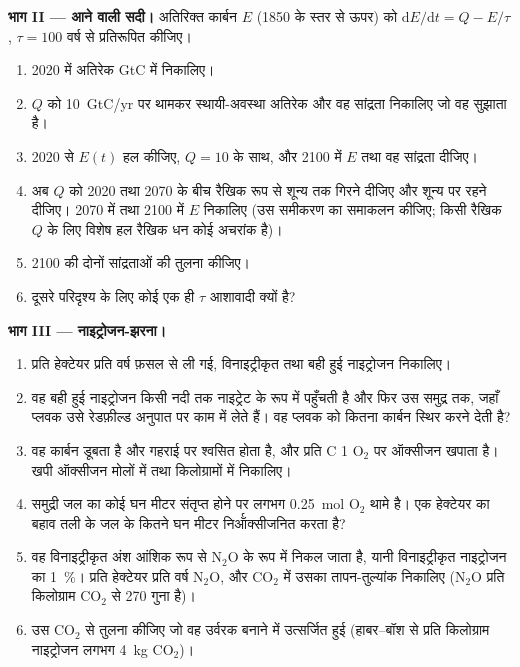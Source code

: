 \begin{problem}
\medskip
\noindent\textbf{भाग II --- आने वाली सदी।}
अतिरिक्त कार्बन $E$ (1850 के स्तर से ऊपर) को
$\mathrm{d}E/\mathrm{d}t = Q - E/\tau$, $\tau = 100$ वर्ष से प्रतिरूपित कीजिए।
\begin{enumerate}[resume]
  \item 2020 में अतिरेक GtC में निकालिए।
  \item $Q$ को \qty{10}{GtC/yr} पर थामकर स्थायी-अवस्था
        अतिरेक और वह सांद्रता निकालिए जो वह सुझाता है।
  \item 2020 से $E(t)$ हल कीजिए, $Q = 10$ के साथ, और 2100 में $E$
        तथा वह सांद्रता दीजिए।
  \item अब $Q$ को 2020 तथा 2070 के बीच रैखिक रूप से शून्य तक गिरने दीजिए और
        शून्य पर रहने दीजिए। 2070 में तथा 2100 में $E$ निकालिए (उस समीकरण का
        समाकलन कीजिए; किसी रैखिक $Q$ के लिए विशेष हल रैखिक धन कोई
        अचरांक है)।
  \item 2100 की दोनों सांद्रताओं की तुलना कीजिए।
  \item दूसरे परिदृश्य के लिए कोई एक ही $\tau$ आशावादी क्यों है?
\end{enumerate}

\medskip
\noindent\textbf{भाग III --- नाइट्रोजन-झरना।}
\begin{enumerate}[resume]
  \item प्रति हेक्टेयर प्रति वर्ष फ़सल से ली गई, विनाइट्रीकृत तथा
        बही हुई नाइट्रोजन निकालिए।
  \item वह बही हुई नाइट्रोजन किसी नदी तक नाइट्रेट के रूप में पहुँचती है और फिर उस
        समुद्र तक, जहाँ प्लवक उसे रेडफ़ील्ड अनुपात पर काम में लेते हैं। वह प्लवक को कितना
        कार्बन स्थिर करने देती है?
  \item वह कार्बन डूबता है और गहराई पर श्वसित होता है, और
        प्रति C 1 $\mathrm{O_2}$ पर ऑक्सीजन खपाता है। खपी ऑक्सीजन
        मोलों में तथा किलोग्रामों में निकालिए।
  \item समुद्री जल का कोई घन मीटर संतृप्त होने पर लगभग \qty{0.25}{mol}
        $\mathrm{O_2}$ थामे है। एक हेक्टेयर का बहाव तली के जल के कितने घन मीटर
        निर्ऑक्सीजनित करता है?
  \item वह विनाइट्रीकृत अंश आंशिक रूप से $\mathrm{N_2O}$ के रूप में निकल जाता है, यानी
        विनाइट्रीकृत नाइट्रोजन का \qty{1}{\%}। प्रति हेक्टेयर प्रति वर्ष $\mathrm{N_2O}$,
        और $\mathrm{CO_2}$ में उसका तापन-तुल्यांक निकालिए
        ($\mathrm{N_2O}$ प्रति किलोग्राम $\mathrm{CO_2}$ से 270 गुना है)।
  \item उस $\mathrm{CO_2}$ से तुलना कीजिए जो वह उर्वरक बनाने में उत्सर्जित हुई
        (हाबर--बॉश से प्रति किलोग्राम नाइट्रोजन लगभग \qty{4}{kg}
        $\mathrm{CO_2}$)।
\end{enumerate}


\end{problem}
